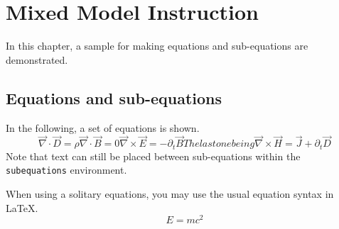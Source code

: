 \chapter{Mixed Model Instruction}

In this chapter, a sample for making equations and sub-equations
are demonstrated.

\section{Equations and sub-equations}

\hspace{\parindent} In the following, a set of equations is shown.
\begin{subequations}
\newcommand\del{\overrightarrow{\nabla}}
\begin{equation}\label{eq:EGauss}
    \del \cdot \vec{D} = \rho
\end{equation}
\begin{equation}\label{eq:BGauss}
    \del \cdot \vec{B} = 0
\end{equation}
\begin{equation}\label{eq:Faraday}
    \del \times \vec{E} = -\partial_t \vec{B}
\end{equation}
The last one being
\begin{equation}\label{eq:Ampere-Maxwell}
    \del \times \vec{H} = \vec{J} + \partial_t \vec{D}
\end{equation}
\end{subequations}
Note that text can still be placed between sub-equations within
the \verb+subequations+ environment.

When using a solitary equations, you may use the usual equation
syntax in \LaTeX.
\begin{equation}\label{eq:Maxwell}
    E = mc^2
\end{equation}
